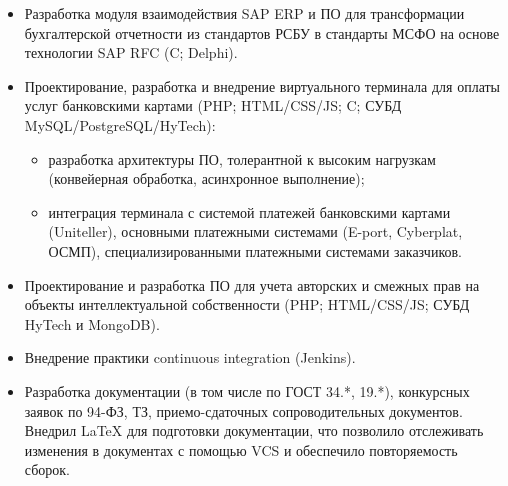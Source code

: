 {\begin{itemize}
\begin{itemize}
	\end{itemize}
	\item Разработка модуля взаимодействия SAP ERP и ПО для трансформации бухгалтерской отчетности из стандартов РСБУ в стандарты МСФО на основе технологии SAP RFC (C; Delphi).	
	\item Проектирование, разработка и внедрение виртуального терминала для оплаты услуг банковскими картами (PHP; HTML/CSS/JS; C; СУБД MySQL/PostgreSQL/HyTech):
	\begin{itemize}
    	\item разработка архитектуры ПО, толерантной к высоким нагрузкам (конвейерная обработка, асинхронное выполнение);
	    \item интеграция терминала с системой платежей банковскими картами (Uniteller), основными платежными системами (E-port, Cyberplat, ОСМП), специализированными платежными системами заказчиков.
	\end{itemize}
	\item Проектирование и разработка ПО для учета авторских и смежных прав на объекты интеллектуальной собственности (PHP; HTML/CSS/JS; СУБД HyTech и MongoDB).
	\item Внедрение практики continuous integration (Jenkins).
	\item Разработка документации (в том числе по ГОСТ 34.*, 19.*), конкурсных заявок по 94-ФЗ, ТЗ, приемо-сдаточных сопроводительных документов. Внедрил LaTeX для подготовки документации, что позволило отслеживать изменения в документах с помощью VCS и обеспечило повторяемость сборок.
\end{itemize}}

